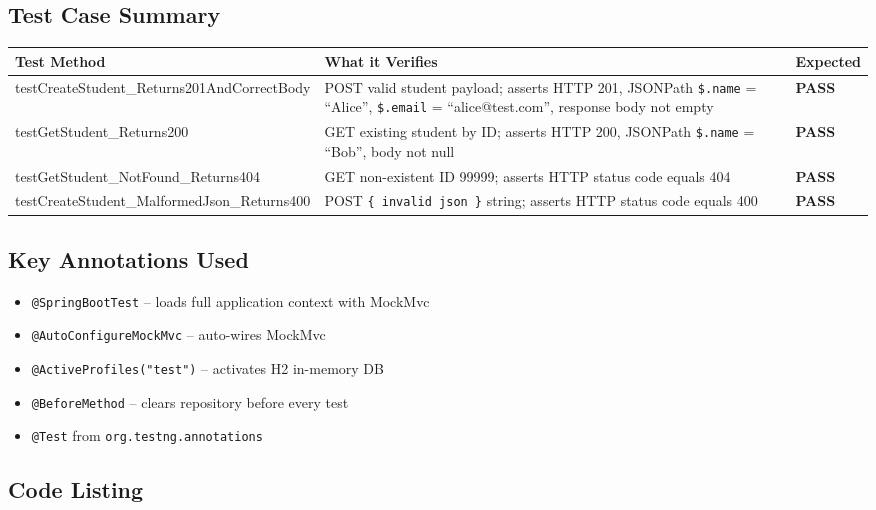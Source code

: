 \documentclass[12pt,a4paper]{article}
\begin{document}
\subsection{Test Case Summary}

\begin{tabularx}{\textwidth}{>{\ttfamily\small}lX>{\bfseries}l}
\toprule
\textbf{Test Method} & \textbf{What it Verifies} & \textbf{Expected} \\
\midrule
testCreateStudent\_Returns201AndCorrectBody
  & POST valid student payload; asserts HTTP 201,
    JSONPath \texttt{\$.name} = ``Alice'', \texttt{\$.email} = ``alice@test.com'',
    response body not empty
  & \textcolor{passgreen}{PASS} \\
\addlinespace
testGetStudent\_Returns200
  & GET existing student by ID; asserts HTTP 200,
    JSONPath \texttt{\$.name} = ``Bob'', body not null
  & \textcolor{passgreen}{PASS} \\
\addlinespace
testGetStudent\_NotFound\_Returns404
  & GET non-existent ID 99999; asserts HTTP status code equals 404
  & \textcolor{passgreen}{PASS} \\
\addlinespace
testCreateStudent\_MalformedJson\_Returns400
  & POST \texttt{\{\ invalid json\ \}} string; asserts HTTP status code equals 400
  & \textcolor{passgreen}{PASS} \\
\bottomrule
\end{tabularx}

\subsection{Key Annotations Used}

\begin{itemize}[noitemsep]
  \item \texttt{@SpringBootTest} -- loads full application context with MockMvc
  \item \texttt{@AutoConfigureMockMvc} -- auto-wires MockMvc
  \item \texttt{@ActiveProfiles("test")} -- activates H2 in-memory DB
  \item \texttt{@BeforeMethod} -- clears repository before every test
  \item \texttt{@Test} from \texttt{org.testng.annotations}
\end{itemize}

\subsection{Code Listing}
\end{document}
